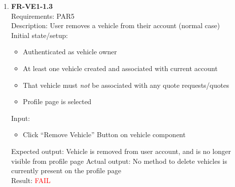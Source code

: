\documentclass[12pt, titlepage]{article}
\newcommand{\testfail}{\textcolor{red}{FAIL}}
\begin{document}
\begin{enumerate}
                \item \textbf{FR-VE1-1.3} \label{FR-VE1-1.3} \\ Requirements: PAR5 \\
                    Description: User removes a vehicle from their account (normal case) \\
                    Initial state/setup: \begin{itemize}
                        \item Authenticated as vehicle owner
                        \item At least one vehicle created and associated with current account
                        \item That vehicle must \textit{not} be associated with any quote requests/quotes
                        \item Profile page is selected
                    \end{itemize}
                    Input: \begin{itemize}
                        \item Click ``Remove Vehicle'' Button on vehicle component
                    \end{itemize}
                    Expected output: Vehicle is removed from user account, and is no longer visible from profile page
                    Actual output: No method to delete vehicles is currently present on the profile page \\
                    Result: \testfail


\end{enumerate}
\end{document}
